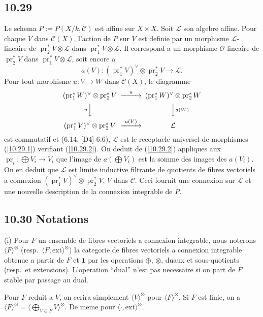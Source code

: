 \documentclass[12pt,a4paper]{article}
\theoremstyle{plain}
\theoremstyle{definition}
\theoremstyle{remark}
\DeclareMathOperator{\pr}{pr}
\newcommand{\ext}{\mathrm{ext}}
\begin{document}
\subsection*{10.29}

Le schema $P := P(X/k, \mathcal{C})$ est affine sur $X \times X$. Soit $\mathcal{L}$ son algebre affine. Pour chaque $V$ dans $\mathcal{C}(X)$, l'action de $P$ sur $V$ est definie par un morphisme $\mathcal{L}$-lineaire de $\pr_2^* V \otimes \mathcal{L}$ dans $\pr_1^* V \otimes \mathcal{L}$. Il correspond a un morphisme $\mathcal{O}$-lineaire de $\pr_2^* V$ dans $\pr_1^* V \otimes \mathcal{L}$, soit encore a
\begin{equation}\label{10.29.1}
a(V): (\pr_1^* V)^\vee \otimes \pr_2^* V \longrightarrow \mathcal{L}. \tag{10.29.1}
\end{equation}
Pour tout morphisme $u: V \to W$ dans $\mathcal{C}(X)$, le diagramme
$$\begin{CD}
(\pr_1^* W)^\vee \otimes \pr_2^* V @>{u}>> (\pr_1^* W)^\vee \otimes \pr_2^* W \\
@V{u}VV @VV{a(W)}V \\
(\pr_1^* V)^\vee \otimes \pr_2^* V @>{a(V)}>> \mathcal{L}
\end{CD}$$
est commutatif et (6.14, [D4] 6.6), $\mathcal{L}$ est le receptacle universel de morphismes (\ref{10.29.1}) verifiant (\ref{10.29.2}). On deduit de (\ref{10.29.2}) appliques aux $\pr_i: \bigoplus V_i \to V_i$ que l'image de $a(\bigoplus V_i)$ est la somme des images des $a(V_i)$. On en deduit que $\mathcal{L}$ est limite inductive filtrante de quotients de fibres vectoriels a connexion $(\pr_1^* V)^\vee \otimes \pr_2^* V$, $V$ dans $\mathcal{C}$. Ceci fournit une connexion sur $\mathcal{L}$ et une nouvelle description de la connexion integrable de $P$.


\subsection*{10.30 Notations}

(i) Pour $F$ un ensemble de fibres vectoriels a connexion integrable, nous noterons $\langle F \rangle^{\otimes}$ (resp.~$\langle F, \ext \rangle^{\otimes}$) la categorie de fibres vectoriels a connexion integrable obtenue a partir de $F$ et $\mathbf{1}$ par les operations $\oplus$, $\otimes$, duaux et sous-quotients (resp.~et extensions). L'operation ``dual'' n'est pas necessaire si on part de $F$ stable par passage au dual.

Pour $F$ reduit a $V$, on ecrira simplement $\langle V \rangle^{\otimes}$ pour $\langle F \rangle^{\otimes}$. Si $F$ est finie, on a $\langle F \rangle^{\otimes} = \langle \bigoplus_{V \in F} V \rangle^{\otimes}$. De meme pour $\langle \cdot, \ext \rangle^{\otimes}$.
\end{document}
